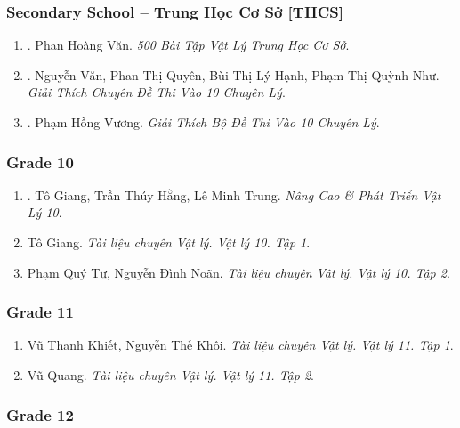 \documentclass{article}
\begin{document}
\subsubsection{Secondary School -- Trung Học Cơ Sở [THCS]}

\begin{enumerate}
	\item \cite{Van_500_BT_Vat_Ly_THCS}. Phan Hoàng Văn. {\it 500 Bài Tập Vật Lý Trung Học Cơ Sở}.\hfill{\sf[reading]}
	\item \cite{Van_Quyen_Hanh_Nhu_10_chuyen_Ly}. Nguyễn Văn, Phan Thị Quyên, Bùi Thị Lý Hạnh, Phạm Thị Quỳnh Như. {\it Giải Thích Chuyên Đề Thi Vào 10 Chuyên Lý}.\hfill{\sf[reading]}
	\item \cite{Vuong_10_chuyen_Ly}. Phạm Hồng Vương. {\it Giải Thích Bộ Đề Thi Vào 10 Chuyên Lý}.\hfill{\sf[reading]}
\end{enumerate}

\subsubsection{Grade 10}

\begin{enumerate}
	\item \cite{Giang_Hang_Trung2022}. Tô Giang, Trần Thúy Hằng, Lê Minh Trung. {\it Nâng Cao \& Phát Triển Vật Lý 10}.\hfill{\sf[reading]}
	\item Tô Giang. {\it Tài liệu chuyên Vật lý. Vật lý 10. Tập 1}.
	\item Phạm Quý Tư, Nguyễn Đình Noãn. {\it Tài liệu chuyên Vật lý. Vật lý 10. Tập 2}.
\end{enumerate}

\subsubsection{Grade 11}

\begin{enumerate}
	\item Vũ Thanh Khiết, Nguyễn Thế Khôi. {\it Tài liệu chuyên Vật lý. Vật lý 11. Tập 1}.
	\item Vũ Quang. {\it Tài liệu chuyên Vật lý. Vật lý 11. Tập 2}.
\end{enumerate}

\subsubsection{Grade 12}
\end{document}
